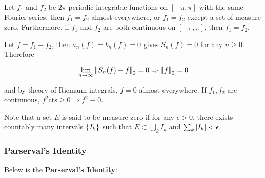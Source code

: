 \documentclass[a4paper,12pt]{article}
\begin{document}
\begin{crl}
  Let $f_{1}$ and $f_{2}$ be $2\pi$-periodic integrable functions on $[-\pi,\pi]$ with the same Fourier series, then $f_{1}=f_{2}$ almost everywhere, or $f_{1}=f_{2}$ except a set of measure zero. Furthermore, if $f_{1}$ and $f_{2}$ are both continuous on $[-\pi,\pi]$, then $f_{1}=f_{2}$.\n

  \prf Let $f=f_{1}-f_{2}$, then $a_{n}(f)=b_{n}(f)=0$ gives $S_{n}(f)=0$ for any $n\geq 0$. Therefore

  $$\lim_{n\to\infty}\left\| S_{n}(f)-f\right\|_{2}=0\Rightarrow \left\| f\right\|_{2}=0$$\s

  and by theory of Riemann integrals, $f=0$ almost everywhere. If $f_{1},f_{2}$ are continuous, $f^{2}\mathrm{cts}\geq 0\Rightarrow f^{2}\equiv 0$.
\end{crl}\n

Note that a set $E$ is said to be measure zero if for any $\epsilon>0$, there exists countably many intervals $\left\{ I_{k}\right\}$ such that $E\subset\bigcup_{k}I_{k}$ and $\sum_{k}\left| I_{k}\right|<\epsilon$.

\subsubsection{Parserval's Identity}
Below is the \textbf{Parserval's Identity}:\n
\end{document}
